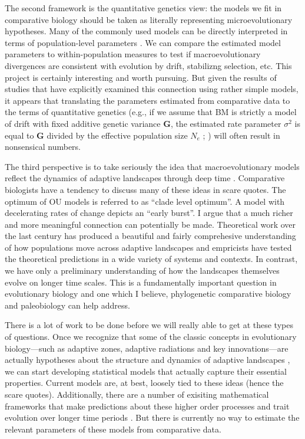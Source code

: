 The second framework is the quantitative genetics view: the models we fit in comparative biology should be taken as literally representing microevolutionary hypotheses. Many of the commonly used models can be directly interpreted in terms of population-level parameters \citep{HansenMartins1996, PennellHarmon}. We can compare the estimated model parameters to within-population measures to test if macroevolutionary divergences are consistent with evolution by drift, stabilizng selection, etc. This project is certainly interesting and worth pursuing. But given the results of studies that have explicitly examined this connection \citep{Lynch1990, EstesArnold2007, Hohenlohe2008, Harmon2010, Bolstad2014} using rather simple models, it appears that translating the parameters estimated from comparative data to the terms of quantitative genetics (e.g., if we assume that BM is strictly a model of drift with fixed additive genetic variance $\mathbf{G}$, the estimated rate parameter $\sigma^2$ is equal to $\mathbf{G}$ divided by the effective population size $N_e$ ; \citealt{Lande1976}) will often result in nonsensical numbers. 

The third perspective is to take seriously the idea that macroevolutionary models reflect the dynamics of adaptive landscapes through deep time \citep{Arnoldetal2001, Hansen2012book, PennellPE}. Comparative biologists have a tendency to discuss many of these ideas in scare quotes. The optimum of OU models is referred to as ``clade level optimum''. A model with decelerating rates of change depicts an ``early burst''. I argue that a much richer and more meaningful connection can potentially be made. Theoretical work over the last century has produced a beautiful and fairly comprehesive understanding of how populations move across adaptive landscapes and empricists have tested the theoretical predictions in a wide variety of systems and contexts. In contrast, we have only a preliminary understanding of how the landscapes themselves evolve on longer time scales. This is a fundamentally important question in evolutionary biology and one which I believe, phylogenetic comparative biology and paleobiology can help address. 

There is a lot of work to be done before we will really able to get at these types of questions. Once we recognize that some of the classic concepts in evolutionary biology---such as adaptive zones, adaptive radiations and key innovations---are actually hypotheses about the structure and dynamics of adaptive landscapes \citep{Hansen2012book}, we can start developing statistical models that actually capture their essential properties. Current models are, at best, loosely tied to these ideas (hence the scare quotes). Additionally, there are a number of exisiting mathematical frameworks that make predictions about these higher order processes and trait evolution over longer time periods \citep[see for example,][]{Holt2003, Gavrilets2004, Doebeli2011}. But there is currently no way to estimate the relevant parameters of these models from comparative data.  

